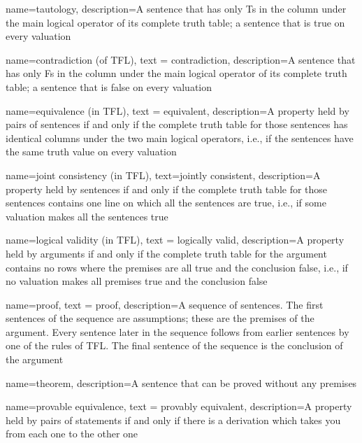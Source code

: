 
{
name=tautology,
description={A sentence that has only Ts in the column under the main logical operator of its \gls{complete truth table}; a sentence that is true on every \gls{valuation}}
}

{
  name=contradiction (of TFL),
  text = contradiction,
description={A sentence that has only Fs in the column under the main logical operator of its \gls{complete truth table}; a sentence that is false on every \gls{valuation}}
}


{
  name=equivalence (in TFL),
  text = equivalent,
description={A property held by pairs of sentences if and only if the \gls{complete truth table} for those sentences has identical columns under the two main logical operators, i.e., if the sentences have the same truth value on every valuation}
}


{
  name=joint consistency (in TFL),
  text=jointly consistent,
description={A property held by sentences if and only if the \gls{complete truth table} for those sentences contains one line on which all the sentences are true, i.e., if some \gls{valuation} makes all the sentences true}
}




{
  name=logical validity (in TFL),
  text = logically valid,
description={A property held by arguments if and only if the \gls{complete truth table} for the argument contains no rows where the \glspl{premise} are all true and the \gls{conclusion} false, i.e., if no \gls{valuation} makes all premises true and the conclusion false}
}



{
  name=proof,
  text = proof,
description={A sequence of sentences. The first sentences of the sequence are assumptions; these are the premises of the argument. Every sentence later in the sequence follows from earlier sentences by one of the rules of TFL. The final sentence of the sequence is the conclusion of the argument}
}



{
name=theorem,
description={A sentence that can be proved without any premises}
}


{
  name=provable equivalence,
  text = provably equivalent,
description={A property held by pairs of statements if and only if there is a derivation which takes you from each one to the other one}
}


